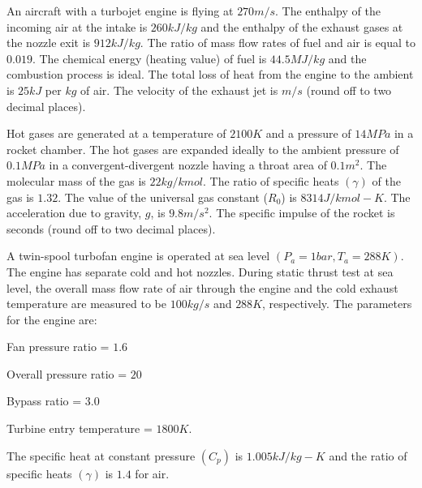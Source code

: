 \iffalse
\chapter{2021}
\author{EE24BTECH11019 - Dwarak A}
\section{ae}
\fi

    \item An aircraft with a turbojet engine is flying at $270 m/s$. The enthalpy of the incoming air at the intake is $260 kJ/kg$ and the enthalpy of the exhaust gases at the nozzle exit is $912 kJ/kg$. The ratio of mass flow rates of fuel and air is equal to $0.019$. The chemical energy (heating value) of fuel is $44.5 MJ/kg$ and the combustion process is ideal. The total loss of heat from the engine to the ambient is $25 kJ$ per $kg$ of air. The velocity of the exhaust jet is \underline{\hspace{1cm}} $m/s$ (round off to two decimal places).

    \item Hot gases are generated at a temperature of $2100 K$ and a pressure of $14 MPa$ in a rocket chamber. The hot gases are expanded ideally to the ambient pressure of $0.1 MPa$ in a convergent-divergent nozzle having a throat area of $0.1 m^2$. The molecular mass of the gas is $22 kg/kmol$. The ratio of specific heats $(\gamma)$ of the gas is $1.32$. The value of the universal gas constant ($R_0$) is $8314 J/kmol-K$. The acceleration due to gravity, $g$, is $9.8 m/s^2$. The specific impulse of the rocket is \underline{\hspace{1cm}} seconds (round off to two decimal places). 
    
    \item A twin-spool turbofan engine is operated at sea level $(P_{a} = 1 bar, T_{a} = 288 K)$. The engine has separate cold and hot nozzles. During static thrust test at sea level, the overall mass flow rate of air through the engine and the cold exhaust temperature are measured to be $100 kg/s$ and $288 K$, respectively. The parameters for the engine are:

Fan pressure ratio = $1.6$

Overall pressure ratio = $20$

Bypass ratio = $3.0$

Turbine entry temperature = $1800 K$.

        The specific heat at constant pressure $(C_{p})$ is $1.005 kJ/kg-K$ and the ratio of specific heats $(\gamma)$ is $1.4$ for air.

